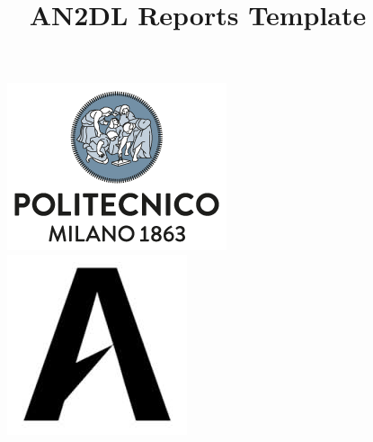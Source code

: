 \documentclass[11pt]{article}
\title{AN2DL Reports Template}
\begin{document}
    
    \begin{figure}[H]
        \raggedright
        \includegraphics[scale=0.4]{polimi.png} \hfill \includegraphics[scale=0.3]{airlab.jpeg}
    \end{figure}
    
    \vspace{5mm}
    
\end{document}

